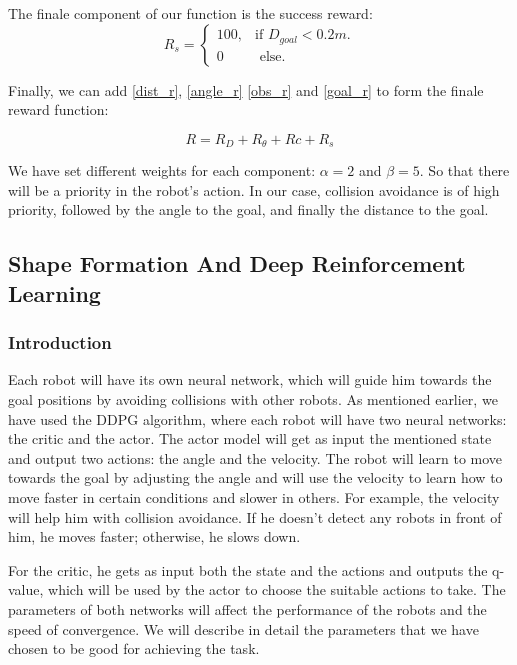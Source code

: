 \documentclass[12pt]{extarticle}
\begin{document}
The finale component of our  function is the success reward:
\begin{equation}  \label{goal_r}
  R_{s}=\begin{cases}
    100, & \text{if $D_{goal}< 0.2m$}.\\
    
    0 & \text{ else}.
  \end{cases}
\end{equation}

Finally, we can add \ref{dist_r}, \ref{angle_r}  \ref{obs_r} and \ref{goal_r} to form the finale reward function: 

 
    \begin{equation} \label{final_r}
     R=R_{D}+R_{\theta}+R{c}+R_{s}
   \end{equation}

We have set different weights for each component: $\alpha = 2$ and $\beta = 5$. So that there will be a priority in the robot's action. In our case, collision avoidance is of high priority, followed by the angle to the goal, and finally the distance to the goal.




\subsection{Shape Formation And Deep Reinforcement Learning}
\subsubsection{Introduction}




Each robot will have its own neural network, which will guide him towards the goal positions by avoiding collisions with other robots.
As mentioned earlier, we have used the DDPG algorithm, where each robot will have two neural networks: the critic and the actor.
The actor model will get as input the mentioned state and output two actions: the angle and the velocity.
The robot will learn to move towards the goal by adjusting the angle and will use the velocity to learn how to move faster in certain conditions and slower in others. For example, the velocity will help him with collision avoidance. If he doesn't detect any robots in front of him, he moves faster; otherwise, he slows down.

For the critic, he gets as input both the state and the actions and outputs the q-value, which will be used by the actor to choose the suitable actions to take.
The parameters of both networks will affect the performance of the robots and the speed of convergence. We will describe in detail the parameters that we have chosen to be good for achieving the task.
\end{document}
